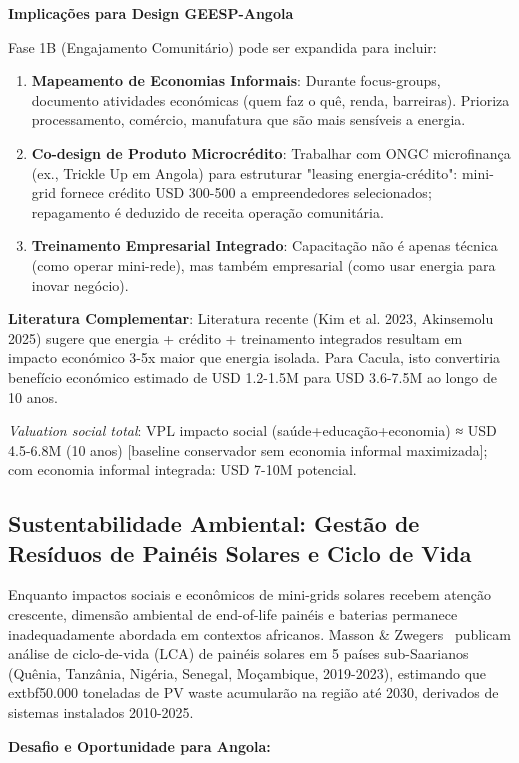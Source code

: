 \documentclass[12pt, a4paper]{article}
\begin{document}
{{{{{{{{{{{\textbf{Implicações para Design GEESP-Angola}

Fase 1B (Engajamento Comunitário) pode ser expandida para incluir:
\begin{enumerate}
\item \textbf{Mapeamento de Economias Informais}: Durante focus-groups, documento atividades económicas (quem faz o quê, renda, barreiras). Prioriza processamento, comércio, manufatura que são mais sensíveis a energia.
\item \textbf{Co-design de Produto Microcrédito}: Trabalhar com ONGC microfinança (ex., Trickle Up em Angola) para estruturar "leasing energia-crédito": mini-grid fornece crédito USD 300-500 a empreendedores selecionados; repagamento é deduzido de receita operação comunitária.
\item \textbf{Treinamento Empresarial Integrado}: Capacitação não é apenas técnica (como operar mini-rede), mas também empresarial (como usar energia para inovar negócio).
\end{enumerate}

\textbf{Literatura Complementar}: Literatura recente (Kim et al. 2023, Akinsemolu 2025) sugere que energia + crédito + treinamento integrados resultam em impacto económico 3-5x maior que energia isolada. Para Cacula, isto convertiria benefício económico estimado de USD 1.2-1.5M para USD 3.6-7.5M ao longo de 10 anos.

\textit{Valuation social total}: VPL impacto social (saúde+educação+economia) ≈ USD 4.5-6.8M (10 anos) [baseline conservador sem economia informal maximizada]; com economia informal integrada: USD 7-10M potencial.

\subsection{Sustentabilidade Ambiental: Gestão de Resíduos de Painéis Solares e Ciclo de Vida}

Enquanto impactos sociais e econômicos de mini-grids solares recebem atenção crescente, dimensão ambiental de end-of-life painéis e baterias permanece inadequadamente abordada em contextos africanos. Masson \& Zwegers~\citep{Masson2023} publicam análise de ciclo-de-vida (LCA) de painéis solares em 5 países sub-Saarianos (Quênia, Tanzânia, Nigéria, Senegal, Moçambique, 2019-2023), estimando que 	extbf{50.000 toneladas de PV waste acumularão na região até 2030}, derivados de sistemas instalados 2010-2025. 

\textbf{Desafio e Oportunidade para Angola:}

}}}}}}}}}}}
\end{document}

